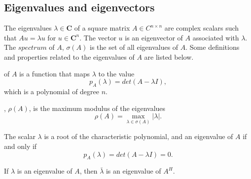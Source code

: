 \documentclass[a4paper,10pt]{report}
\begin{document}
\subsection{Eigenvalues and eigenvectors}
The eigenvalues $\lambda \in \mathbf{C}$ of a square matrix $A \in C^{n\times n}$ are complex scalars such that 
$Au=\lambda u$ for $u \in \mathbf{C}^n$. The vector $u$ is an eigenvector of $A$ associated with $\lambda$. The $spectrum$ of
$A$, $\sigma(A)$ is the set of all eigenvalues of $A$.
Some definitions and properties related to the eigenvalues of $A$ are listed below.
\begin{description}
\item[The characteristic polynomial] of $A$ is a function that maps $\lambda$ to the value $$p_A(\lambda )=det(A-\lambda I),$$ which is a polynomial
of degree $n$. 
\item[The spectral radius], $\rho (A)$, is the maximum modulus of the eigenvalues 
$$\rho(A)=\max_{\lambda\in \sigma(A)}|\lambda|.$$
\item The scalar $\lambda$ is a root of the characteristic polynomial, and an eigenvalue of $A$ if and only if $$p_A(\lambda )=det(A-\lambda I)=0.$$
\item If $\lambda$ is an eigenvalue of $A$, then $\bar{\lambda}$ is an eigenvalue of $A^H$.
\end{description}
\end{document}
